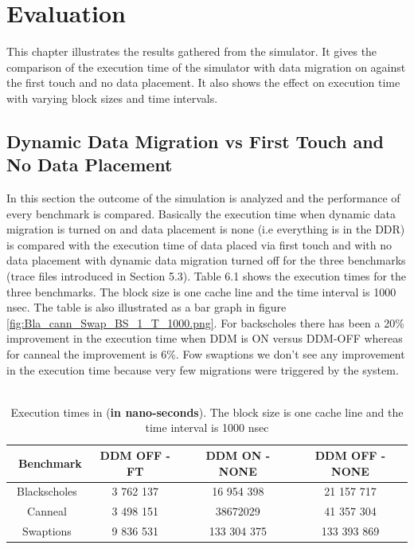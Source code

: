 \documentclass{listhesis}
\begin{document}
\chapter{Evaluation}
This chapter illustrates the results gathered from the simulator. It gives the comparison of the execution time of the simulator with data migration on against the first touch and no data placement. It also shows the effect on execution time with varying block sizes and time intervals.
\section{Dynamic Data Migration vs First Touch and No Data Placement}
In this section the outcome of the simulation is analyzed and the performance of every benchmark is compared. Basically the execution time when dynamic data migration is turned on and data placement is none (i.e everything is in the DDR) is compared with the execution time of data placed via first touch and with no data placement with dynamic data migration turned off for the three benchmarks (trace files introduced in Section 5.3). Table 6.1 shows the execution times for the three benchmarks. The block size is one cache line and the time interval is 1000 nsec. The table is also illustrated as a bar graph in figure \ref{fig:Bla_cann_Swap_BS_1_T_1000.png}. For backscholes there has been a 20\% improvement in the execution time when DDM is ON versus DDM-OFF whereas for canneal the improvement is 6\%. Fow swaptions we don't see any improvement in the execution time because very few migrations were triggered by the system.\\
\\
\begin{table}[h!]
\begin{center}
 \begin{tabular}{|| c | c | c | c||} 
 \hline
 \ \textbf{Benchmark} & \textbf{DDM OFF - FT}  & \textbf{DDM ON - NONE}  & \textbf{DDM OFF - NONE}\\ [0.5 ex] 
 \hline\hline
  Blackscholes   &   3 762 137   &   16 954 398	    &  21 157 717 \\ 
 \hline
   Canneal  	&   3 498 151    &   38672029   	&   41 357 304   \\
 \hline
    Swaptions   &   9 836 531     &   133 304 375 	&   133 393 869   \\
 \hline
\end{tabular}
 \caption{Execution times in (\textbf{in nano-seconds}). The block size is one cache line and the time interval is 1000 nsec}
 \label{table:ExecTimes1}
\end{center}
\end{table}
\end{document}
